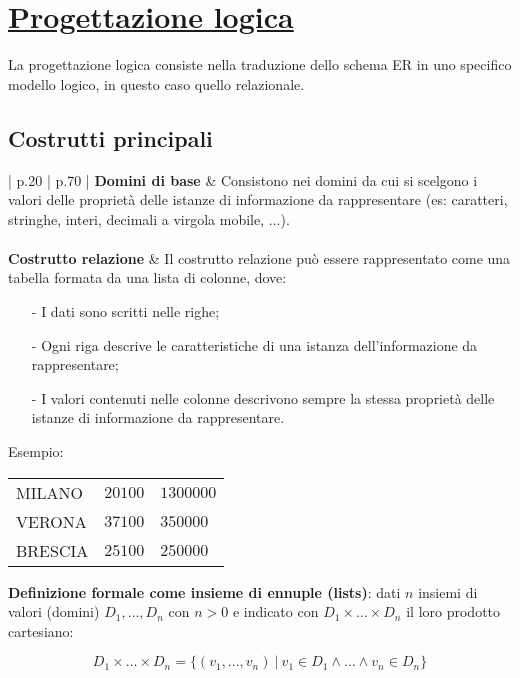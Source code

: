 \documentclass[a4paper, 10pt]{report}
\begin{document}
\section*{\underline{Progettazione logica}}
La progettazione logica consiste nella traduzione dello schema ER in uno specifico modello logico, in questo caso quello relazionale.

\subsection*{Costrutti principali}
\begin{longtable}{| p{} | p{} |}
\textbf{Domini di base} & Consistono nei domini da cui si scelgono i valori delle
proprietà delle istanze di informazione da
rappresentare (es: caratteri, stringhe, interi, decimali a virgola mobile, ...).
\\\\
\textbf{Costrutto relazione} & Il costrutto relazione può essere rappresentato come una tabella formata da una lista di colonne, dove:
\begin{itemize}
\item[-] I dati sono scritti nelle righe;
\item[-] Ogni riga descrive le
caratteristiche di una istanza dell’informazione da rappresentare;
\item[-] I valori contenuti nelle colonne descrivono sempre la stessa
proprietà delle istanze di informazione da rappresentare.
\end{itemize}

Esempio:
\begin{center}
\begin{tabular}{lll}
			MILANO  & $20100$ & $1300000$ \\
			VERONA  & $37100$ & $350000$ \\
			BRESCIA & $25100$ & $250000$\\
		\end{tabular}
\end{center}

\medskip

\textbf{Definizione formale come insieme di ennuple (lists)}: dati $n$ insiemi di valori (domini) $D_1, \dots , D_n$ con $n > 0$ e indicato con $D_1 \times\dots \times D_n$ il loro prodotto cartesiano:
			
			\[
				D_1 \times \dots \times D_n = \{ (v_1, \dots, v_n) \: | \: 
				v_1 \in D_1 \wedge \dots \wedge v_n \in D_n \}
			\]
			

\end{longtable}
\end{document}
